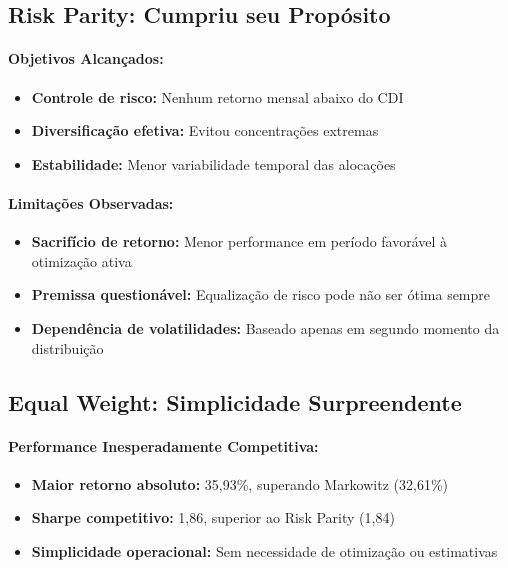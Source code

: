 \subsection{Risk Parity: Cumpriu seu Propósito}

\paragraph{Objetivos Alcançados:}
\begin{itemize}
    \item \textbf{Controle de risco:} Nenhum retorno mensal abaixo do CDI
    \item \textbf{Diversificação efetiva:} Evitou concentrações extremas
    \item \textbf{Estabilidade:} Menor variabilidade temporal das alocações
\end{itemize}

\paragraph{Limitações Observadas:}
\begin{itemize}
    \item \textbf{Sacrifício de retorno:} Menor performance em período favorável à otimização ativa
    \item \textbf{Premissa questionável:} Equalização de risco pode não ser ótima sempre
    \item \textbf{Dependência de volatilidades:} Baseado apenas em segundo momento da distribuição
\end{itemize}

\subsection{Equal Weight: Simplicidade Surpreendente}

\paragraph{Performance Inesperadamente Competitiva:}
\begin{itemize}
    \item \textbf{Maior retorno absoluto:} 35,93\%, superando Markowitz (32,61\%)
    \item \textbf{Sharpe competitivo:} 1,86, superior ao Risk Parity (1,84)
    \item \textbf{Simplicidade operacional:} Sem necessidade de otimização ou estimativas
\end{itemize}

